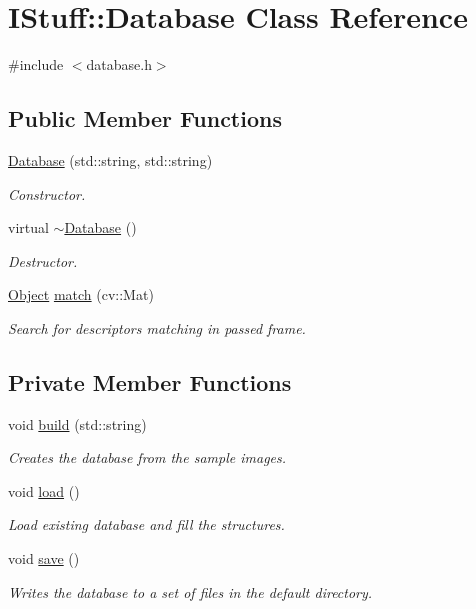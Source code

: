 \hypertarget{class_i_stuff_1_1_database}{\section{I\-Stuff\-:\-:Database Class Reference}
\label{class_i_stuff_1_1_database}
}


{\ttfamily \#include $<$database.\-h$>$}

\subsection*{Public Member Functions}
\begin{DoxyCompactItemize}
\item 
\hyperlink{class_i_stuff_1_1_database_ab569353f3a7991f6eb8345a2d9d61d6b}{Database} (std\-::string, std\-::string)
\begin{DoxyCompactList}\small\item\em Constructor. \end{DoxyCompactList}\item 
virtual \hyperlink{class_i_stuff_1_1_database_a84d399a2ad58d69daab9b05330e1316d}{$\sim$\-Database} ()
\begin{DoxyCompactList}\small\item\em Destructor. \end{DoxyCompactList}\item 
\hyperlink{class_i_stuff_1_1_object}{Object} \hyperlink{class_i_stuff_1_1_database_afc2ff4e18f1b9477722889ee06a765db}{match} (cv\-::\-Mat)
\begin{DoxyCompactList}\small\item\em Search for descriptors matching in passed frame. \end{DoxyCompactList}\end{DoxyCompactItemize}
\subsection*{Private Member Functions}
\begin{DoxyCompactItemize}
\item 
void \hyperlink{class_i_stuff_1_1_database_aed93b2b7c426f730488f66d0909b1212}{build} (std\-::string)
\begin{DoxyCompactList}\small\item\em Creates the database from the sample images. \end{DoxyCompactList}\item 
void \hyperlink{class_i_stuff_1_1_database_a0d09456daeb72a2a2fb432650e55025f}{load} ()
\begin{DoxyCompactList}\small\item\em Load existing database and fill the structures. \end{DoxyCompactList}\item 
void \hyperlink{class_i_stuff_1_1_database_a3aae61eb0bc2fa65398f809cc5aa1065}{save} ()
\begin{DoxyCompactList}\small\item\em Writes the database to a set of files in the default directory. \end{DoxyCompactList}\end{DoxyCompactItemize}
